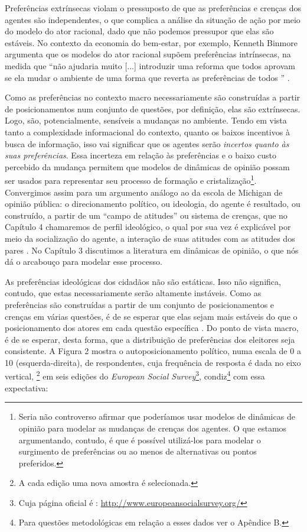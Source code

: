 Preferências extrínsecas violam o pressuposto de que as preferências e crenças
dos agentes são independentes, o que complica a análise da situação de ação por
meio do modelo do ator racional, dado que não podemos pressupor que elas são
estáveis. No contexto da economia do bem-estar, por exemplo,
Kenneth Binmore argumenta que os modelos do ator racional supõem
preferências intrínsecas, na medida que ``não ajudaria muito [...] introduzir uma
reforma que todos aprovam se ela mudar o ambiente de uma forma que reverta as
preferências de todos '' \cite[p.6]{binmore2008rational}.

Como as preferências no contexto macro necessariamente são construídas a partir
de posicionamentos num conjunto de questões, por definição, elas são
extrínsecas. Logo, são, potencialmente, sensíveis a mudanças no ambiente. Tendo
em vista tanto a complexidade informacional do contexto, quanto os baixos
incentivos à busca de informação, isso vai significar que os agentes serão
\textit{incertos quanto às suas preferências}. Essa incerteza em relação às
preferências e o baixo custo percebido da mudança permitem que modelos de
dinâmicas de opinião possam ser usados para representar seu processo de formação
e cristalização\footnote{Seria não controverso afirmar que poderíamos usar
  modelos de dinâmicas de opinião para modelar as mudanças de crenças dos
  agentes. O que estamos argumentando, contudo, é que é  possível utilizá-los para
  modelar o surgimento de preferências ou ao menos de alternativas ou
  pontos preferidos.}. Convergimos assim para um argumento análogo ao da escola
de Michigan de opinião pública: o direcionamento político, ou ideologia, do
agente é resultado, ou construído, a partir de um ``campo de atitudes'' ou
sistema de crenças, que no Capítulo 4 chamaremos de perfil ideológico, o qual
por sua vez é explicável por meio da socialização do agente, a interação de suas
atitudes com as atitudes dos pares \cite{figueiredo2008decisao}. No Capítulo 3
discutimos a literatura em dinâmicas de opinião, o que nós dá o arcabouço para
modelar esse processo.

As preferências ideológicas dos cidadãos não são estáticas. Isso não significa,
contudo, que estas necessariamente serão altamente instáveis. Como as
preferências são construídas a partir de um conjunto de posicionamentos e
crenças em várias questões, é de se esperar que elas sejam mais estáveis do que
o posicionamento dos atores em cada questão específica
\cite{druckman2012public}. Do ponto de vista macro, é de se esperar, desta
forma, que a distribuição de preferências dos eleitores seja consistente. A
Figura 2  mostra o autoposicionamento político, numa escala de 0 a 10
(esquerda-direita), de respondentes, cuja frequência de resposta é dada no eixo
vertical, \footnote{A cada edição uma nova amostra é selecionada.} em seis
edições do \textit{European Social Survey}\footnote{Cuja página oficial é :
  \url{http://www.europeansocialsurvey.org/}}, condiz\footnote{Para questões
  metodológicas em relação a esses dados ver o Apêndice B.} com essa
expectativa:

